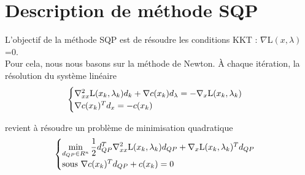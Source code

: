 \section{Description de méthode SQP}\bigbreak
L'objectif de la méthode SQP est de résoudre les conditions KKT : $\nabla$L$(x,\lambda)$=0.\\
Pour cela, nous nous basons sur la méthode de Newton. \`A chaque itération, la résolution du système linéaire\\


\begin{equation*}
\begin{cases}
\nabla_{xx}^2 $L$(x_k,\lambda_k)d_k + \nabla c(x_k)d_{\lambda}=-\nabla_x $L$(x_k,\lambda_k)\\
\nabla c(x_k)^{T} d_x = -c(x_k)
\end{cases}
\end{equation*}

revient à résoudre un problème de minimisation quadratique \\
\begin{equation*}
\begin{cases}
\displaystyle \min_{d_{QP} \in {R^n}} \frac{1}{2}d_{QP}^{T}\nabla_{xx}^2$L$(x_k,\lambda_k) d_{QP} + 
\nabla_x $L$(x_k,\lambda_k)^{T}d_{QP} \\ $sous   $  \nabla c(x_k)^{T}d_{QP}+c(x_k) = 0
\end{cases}
\end{equation*}

